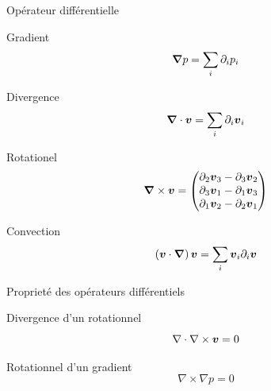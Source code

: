 \begin{frame}{Opérateur différentielle}

\begin{block}{Gradient}
\begin{equation*}
 {\boldsymbol {\nabla}}p=\sum_{i}\partial_{i}p_{i}
\end{equation*}
\end{block}

\begin{block}{Divergence}
\begin{equation*}
 {\boldsymbol {\nabla}}\cdot {\boldsymbol {v}}=\sum_{i}\partial_{i}{\boldsymbol {v}}_{i}
\end{equation*}
\end{block}

\begin{block}{Rotationel}
\begin{equation*}
 {\boldsymbol {\nabla}} \times {\boldsymbol {v}}=\begin{pmatrix}
                                \partial_{2}{\boldsymbol {v}}_{3}-\partial_{3}{\boldsymbol {v}}_{2}\\
                                \partial_{3}{\boldsymbol {v}}_{1}-\partial_{1}{\boldsymbol {v}}_{3}\\
                                \partial_{1}{\boldsymbol {v}}_{2}-\partial_{2}{\boldsymbol {v}}_{1}\\
                               \end{pmatrix}
 \end{equation*}
\end{block}


\begin{block}{Convection}
\begin{equation*}
 \left({\boldsymbol {v}}\cdot {\boldsymbol {\nabla}}\right){\boldsymbol {v}}=\sum_{i} {\boldsymbol {v}}_{i}\partial_{i} {\boldsymbol {v}}
 \end{equation*}
\end{block}


\end{frame}
\begin{frame}[<+->]{Proprieté des opérateurs différentiels}
 \begin{property}{Divergence d'un rotationnel}
  \begin{equation*}
  \nabla \cdot \nabla \times {\boldsymbol {v}}=0
  \end{equation*}
 \end{property}

 \begin{property}{Rotationnel d'un gradient}
  \begin{equation*}
  \nabla \times \nabla p=0
  \end{equation*}
 \end{property}
\end{frame}
